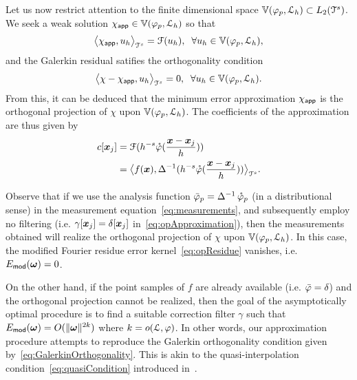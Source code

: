 Let us now restrict attention to the finite dimensional space
$\aspace{\lattice{L}_h}{\varphi_p} \subset L_2(\cube^s)$. We seek a
weak solution $\appf{\chi} \in \aspace{\lattice{L}_h}{\varphi_p}$ so that
\begin{equation}
  \innerproduct{\appf{\chi}}{u_h} = \mathcal{F}(u_h), \;\;
  \forall u_h \in \aspace{\lattice{L}_h}{\varphi_p},
\end{equation}
and the Galerkin residual satifies the orthogonality condition
\begin{equation}
  \innerproduct{\chi - \appf{\chi}}{u_h} = 0, \;\;
  \forall u_h \in \aspace{\lattice{L}_h}{\varphi_p}.
  \label{eq:GalerkinOrthogonality}
\end{equation}
From this, it can be deduced that the minimum error approximation $\appf{\chi}$ is the orthogonal projection of $\chi$ upon $\aspace{\lattice{L}_h}{\varphi_p}$. The coefficients of the approximation are thus given by
\begin{equation}
  \begin{split}
    c[\vect{x}_j] & = \mathcal{F}(h^{-s}
    \dual{\varphi}(\frac{\vect{x}-\vect{x}_j}{h})) \\
    & = 
    \innerproduct{f(\vect{x})}{\invlaplacian(h^{-s}\dual{\varphi}(\frac{\vect{x}-\vect{x}_j}{h}))}.
  \end{split}
\end{equation}

Observe that if we use the analysis function $\analysis{\varphi}_p = \invlaplacian \dual{\varphi}_p$ (in a distributional sense) in the measurement equation~\eqref{eq:measurements}, and subsequently employ no filtering (i.e. $\gamma[\vect{x}_j] = \delta[\vect{x}_j]$ in~\eqref{eq:opApproximation}), then the measurements obtained will realize the orthogonal projection of $\chi$ upon $\aspace{\lattice{L}_h}{\varphi_p}$. In this case, the modified Fourier residue error kernel~\eqref{eq:opResidue} vanishes, i.e. $E_{\mathsf{mod}}(\vect{\omega}) = 0$.

On the other hand, if the point samples of $f$ are already available (i.e. $\analysis{\varphi} = \delta$) and the orthogonal projection cannot be realized, then the goal of the asymptotically optimal
procedure is to find a suitable correction filter $\gamma$ such that $E_{\mathsf{mod}}(\vect{\omega}) = O(\norm{\vect{\omega}}^{2k})$ where $k = \order{\lattice{L}}{\varphi}$.  
In other words, our approximation procedure attempts to reproduce the Galerkin orthogonality condition given by~\eqref{eq:GalerkinOrthogonality}. This is akin to the quasi-interpolation condition~\eqref{eq:quasiCondition} introduced
in~.

